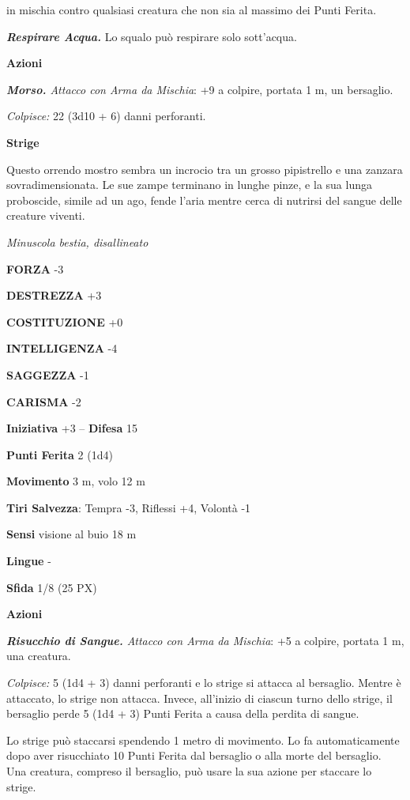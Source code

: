 \begin{multicols}{2}
in mischia contro qualsiasi creatura che non sia al massimo dei Punti Ferita.

\textit{\textbf{Respirare Acqua.}} Lo squalo può respirare solo sott'acqua.

\textbf{Azioni}

\textit{\textbf{Morso.} Attacco con Arma da Mischia}: +9 a colpire, portata 1 m, un bersaglio.

\textit{Colpisce:} 22 (3d10 + 6) danni perforanti.

\medskip\textbf{Strige}

Questo orrendo mostro sembra un incrocio tra un grosso pipistrello e una zanzara sovradimensionata. Le sue zampe terminano in lunghe pinze, e la sua lunga proboscide, simile ad un ago, fende l'aria mentre cerca di nutrirsi del sangue delle creature viventi.

\textit{Minuscola bestia, disallineato}

\textbf{FORZA} -3

\textbf{DESTREZZA} +3

\textbf{COSTITUZIONE} +0

\textbf{INTELLIGENZA} -4

\textbf{SAGGEZZA} -1

\textbf{CARISMA} -2

\textbf{Iniziativa} +3 -- \textbf{Difesa} 15

\textbf{Punti Ferita} 2 (1d4)

\textbf{Movimento} 3 m, volo 12 m

\textbf{Tiri Salvezza}: Tempra -3, Riflessi +4, Volontà -1

\textbf{Sensi} visione al buio 18 m

\textbf{Lingue} -

\textbf{Sfida} 1/8 (25 PX)

\textbf{Azioni}

\textit{\textbf{Risucchio di Sangue.} Attacco con Arma da Mischia}: +5 a colpire, portata 1 m, una creatura.

\textit{Colpisce:} 5 (1d4 + 3) danni perforanti e lo strige si attacca al bersaglio. Mentre è attaccato, lo strige non attacca. Invece, all'inizio di ciascun turno dello strige, il bersaglio perde 5 (1d4 + 3) Punti Ferita a causa della perdita di sangue.

Lo strige può staccarsi spendendo 1 metro di movimento. Lo fa automaticamente dopo aver risucchiato 10 Punti Ferita dal bersaglio o alla morte del bersaglio. Una creatura, compreso il bersaglio, può usare la sua azione per staccare lo strige.


\end{multicols}
